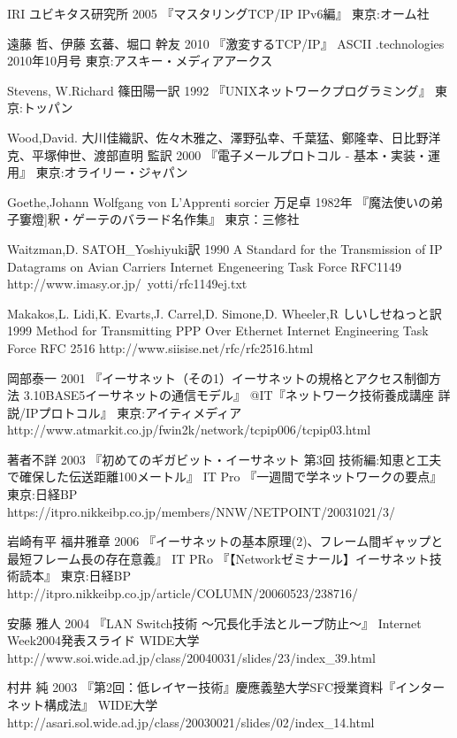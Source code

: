 \begin{thebibliography}{99}
\item
	IRI
	ユビキタス研究所
	2005
	『マスタリングTCP/IP IPv6編』
	東京:オーム社
\item
	遠藤 哲、伊藤 玄蕃、堀口 幹友
	2010
	『激変するTCP/IP』
	ASCII .technologies 2010年10月号
	東京:アスキー・メディアアークス
\item
      Stevens, W.Richard
	篠田陽一訳
	1992
	『UNIXネットワークプログラミング』
	東京:トッパン
\item
     Wood,David.
	大川佳織訳、佐々木雅之、澤野弘幸、千葉猛、鄭隆幸、日比野洋克、平塚伸世、渡部直明 監訳
	2000
	『電子メールプロトコル - 基本・実装・運用』
	東京:オライリー・ジャパン	
\item
      Goethe,Johann Wolfgang von
	L'Apprenti sorcier
	万足卓
	1982年
	『魔法使いの弟子窶燈]釈・ゲーテのバラード名作集』
	東京：三修社
\item
	Waitzman,D.
	SATOH\_Yoshiyuki訳
	1990
	A Standard for the Transmission of IP Datagrams on Avian Carriers Internet Engeneering Task Force RFC1149
	http://www.imasy.or.jp/~yotti/rfc1149ej.txt
\item
     Makakos,L. Lidi,K. Evarts,J. Carrel,D. Simone,D. Wheeler,R
	しいしせねっと訳
	1999
	Method for Transmitting PPP Over Ethernet Internet Engineering Task Force RFC 2516
     http://www.siisise.net/rfc/rfc2516.html
\item
     岡部泰一
	2001
	『イーサネット（その1）イーサネットの規格とアクセス制御方法 3.10BASE5イーサネットの通信モデル』 @IT『ネットワーク技術養成講座 詳説/IPプロトコル』 
	東京:アイティメディア
     http://www.atmarkit.co.jp/fwin2k/network/tcpip006/tcpip03.html
\item
     著者不詳
	2003
	『初めてのギガビット・イーサネット 第3回 技術編:知恵と工夫で確保した伝送距離100メートル』 IT Pro 『一週間で学ネットワークの要点』
	東京:日経BP
     https://itpro.nikkeibp.co.jp/members/NNW/NETPOINT/20031021/3/
\item
    岩崎有平 福井雅章
	2006
	『イーサネットの基本原理(2)、フレーム間ギャップと最短フレーム長の存在意義』 IT PRo 『【Networkゼミナール】イーサネット技術読本』
	東京:日経BP
     http://itpro.nikkeibp.co.jp/article/COLUMN/20060523/238716/
\item
     安藤 雅人
	2004
	『LAN Switch技術 ～冗長化手法とループ防止～』 Internet Week2004発表スライド
	WIDE大学
     http://www.soi.wide.ad.jp/class/20040031/slides/23/index\_39.html
\item
     村井 純
	2003
	『第2回：低レイヤー技術』慶應義塾大学SFC授業資料『インターネット構成法』
	WIDE大学
     http://asari.sol.wide.ad.jp/class/20030021/slides/02/index\_14.html

\end{thebibliography}

